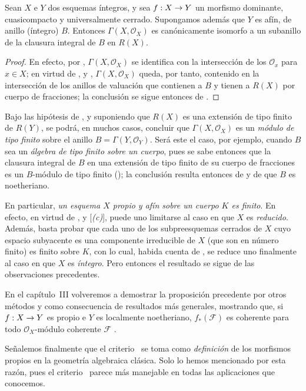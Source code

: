 \documentclass[oneside,10pt]{amsart}
\makeatletter
\newcommand{\ega@arrow}[2]{\mathchoice{#1}{#2}{#2}{#2}}
\renewcommand{\to}{\ega@arrow{\longrightarrow}{\rightarrow}}
\let\EGAOriginalLabel\label
\renewcommand{\label}[1]{\phantomsection\EGAOriginalLabel{#1}}
\makeatother
\begin{document}
\begin{corollary}[7.3.11]
\label{II.7.3.11-fr}
Sean $X$ e $Y$ dos esquemas íntegros, y sea $f:X\to Y$ un morfismo dominante, cuasicompacto y universalmente cerrado.
Supongamos además que $Y$ es afín, de anillo (íntegro) $B$.
Entonces $\Gamma(X,\mathcal{O}_X)$ es canónicamente isomorfo a un subanillo de la clausura integral de $B$ en $R(X)$.
\end{corollary}

\begin{proof}
En efecto, por , $\Gamma(X,\mathcal{O}_X)$ se identifica con la intersección de los $\mathcal{O}_x$ para $x\in X$;
en virtud de ,  y , $\Gamma(X,\mathcal{O}_X)$ queda, por tanto, contenido en la intersección de los anillos de valuación que contienen a $B$ y tienen a $R(X)$ por cuerpo de fracciones;
la conclusión se sigue entonces de .
\end{proof}

\begin{remarks}[7.3.12]
\label{II.7.3.12-fr}
Bajo las hipótesis de , y suponiendo que $R(X)$ es una extensión de tipo finito de $R(Y)$, se podrá, en muchos casos, concluir que $\Gamma(X,\mathcal{O}_X)$ es un \emph{módulo de tipo finito} sobre el anillo $B=\Gamma(Y,\mathcal{O}_Y)$.
Será este el caso, por ejemplo, cuando $B$ sea un \emph{álgebra de tipo finito sobre un cuerpo}, pues se sabe entonces que la clausura integral de $B$ en una extensión de tipo finito de su cuerpo de fracciones es un $B$-módulo de tipo finito (\cite[t.~I, p.~267, th.~9]{I-13});
la conclusión resulta entonces de  y de que $B$ es noetheriano.

En particular, \emph{un esquema $X$ propio y afín sobre un cuerpo $K$ es finito}.
En efecto, en virtud de ,  y [\emph{(c)}], puede uno limitarse al caso en que $X$ es \emph{reducido}.
Además, basta probar que cada uno de los subpreesquemas cerrados de $X$ cuyo espacio subyacente es una componente irreducible de $X$ (que son en número finito) es finito sobre $K$, con lo cual, habida cuenta de , se reduce uno finalmente al caso en que $X$ es \emph{íntegro}.
Pero entonces el resultado se sigue de las observaciones precedentes.

En el capítulo~III volveremos a demostrar la proposición precedente por otros métodos y como consecuencia de resultados más generales, mostrando que, si $f:X\to Y$ es propio e $Y$ es localmente noetheriano, $f_*(\mathcal{F})$ es coherente para todo $\mathcal{O}_X$-módulo coherente $\mathcal{F}$ .

Señalemos finalmente que el criterio~ se toma como \emph{definición} de los morfismos propios en la geometría algebraica clásica.
Solo lo hemos mencionado por esta razón, pues el criterio~ parece más manejable en todas las aplicaciones que conocemos.
\end{remarks}
\end{document}
